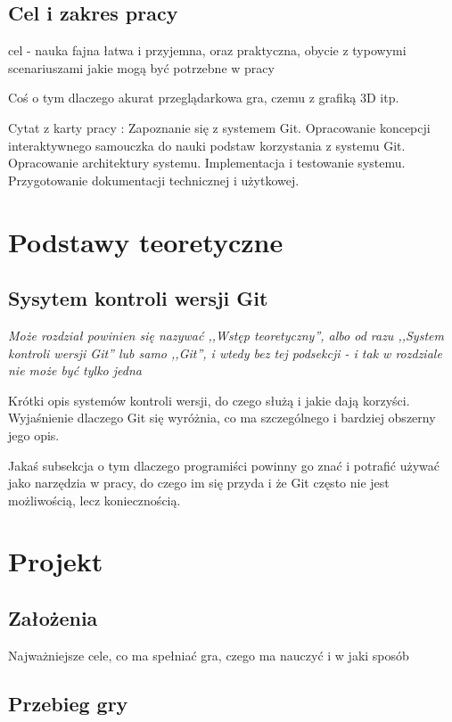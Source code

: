 \documentclass[11pt,a4paper,polish,thesis]{dcsbook}
\begin{document}
	\section*{Cel i zakres pracy}
	
	cel - nauka fajna łatwa i przyjemna, oraz praktyczna, obycie z typowymi scenariuszami jakie mogą być potrzebne w pracy
	
	Coś o tym dlaczego akurat przeglądarkowa gra, czemu z grafiką 3D itp.
	
	Cytat z karty pracy : Zapoznanie się z systemem Git. Opracowanie koncepcji interaktywnego samouczka do nauki podstaw korzystania z systemu Git.  Opracowanie architektury systemu. Implementacja i testowanie systemu. Przygotowanie dokumentacji technicznej i użytkowej.
	
	\chapter{Podstawy teoretyczne}
	
	\section{Sysytem kontroli wersji Git}
	\textit{Może rozdział powinien się nazywać ,,Wstęp teoretyczny'', albo od razu ,,System kontroli wersji Git'' lub samo ,,Git'', i wtedy bez tej podsekcji - i tak w rozdziale nie może być tylko jedna}
	
	Krótki opis systemów kontroli wersji, do czego służą i jakie dają korzyści. Wyjaśnienie dlaczego Git się wyróżnia, co ma szczególnego i bardziej obszerny jego opis. 
	
	Jakaś subsekcja o tym dlaczego programiści powinny go znać i potrafić używać jako narzędzia w pracy, do czego im się przyda i że Git często nie jest możliwością, lecz koniecznością.
	
	\chapter{Projekt}
	
	\section{Założenia}
	
	Najważniejsze cele, co ma spełniać gra, czego ma nauczyć i w jaki sposób
	
	\section{Przebieg gry}
	
\end{document}
